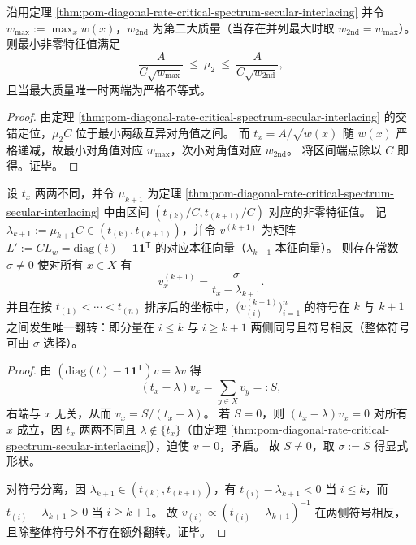 \begin{corollary}[临界谱的交错与首个谱隙夹逼]\label{cor:pom-diagonal-rate-critical-spectrum-gap-bounds}
沿用定理 \ref{thm:pom-diagonal-rate-critical-spectrum-secular-interlacing} 并令 \(w_{\max}:=\max_x w(x)\)，\(w_{\mathrm{2nd}}\) 为第二大质量（当存在并列最大时取 \(w_{\mathrm{2nd}}=w_{\max}\)）。
则最小非零特征值满足
\[
\frac{A}{C\sqrt{w_{\max}}}\ \le\ \mu_2\ \le\ \frac{A}{C\sqrt{w_{\mathrm{2nd}}}},
\]
且当最大质量唯一时两端为严格不等式。
\end{corollary}
\begin{proof}
由定理 \ref{thm:pom-diagonal-rate-critical-spectrum-secular-interlacing} 的交错定位，\(\mu_2 C\) 位于最小两级互异对角值之间。
而 \(t_x=A/\sqrt{w(x)}\) 随 \(w(x)\) 严格递减，故最小对角值对应 \(w_{\max}\)，次小对角值对应 \(w_{\mathrm{2nd}}\)。
将区间端点除以 \(C\) 即得。证毕。
\end{proof}

\begin{proposition}[临界本征向量的显式形状与符号分离]\label{prop:pom-diagonal-rate-critical-eigenvector-shape-sign-separation}
设 \(t_x\) 两两不同，并令 \(\mu_{k+1}\) 为定理 \ref{thm:pom-diagonal-rate-critical-spectrum-secular-interlacing} 中由区间 \((t_{(k)}/C,t_{(k+1)}/C)\) 对应的非零特征值。
记 \(\lambda_{k+1}:=\mu_{k+1}C\in(t_{(k)},t_{(k+1)})\)，并令 \(v^{(k+1)}\) 为矩阵 \(L':=CL_w=\mathrm{diag}(t)-\mathbf 1\mathbf 1^{\mathsf T}\) 的对应本征向量（\(\lambda_{k+1}\)-本征向量）。
则存在常数 \(\sigma\ne 0\) 使对所有 \(x\in X\) 有
\[
v^{(k+1)}_x=\frac{\sigma}{t_x-\lambda_{k+1}}.
\]
并且在按 \(t_{(1)}<\cdots<t_{(n)}\) 排序后的坐标中，\(\bigl(v^{(k+1)}_{(i)}\bigr)_{i=1}^n\) 的符号在 \(k\) 与 \(k+1\) 之间发生唯一翻转：即分量在 \(i\le k\) 与 \(i\ge k+1\) 两侧同号且符号相反（整体符号可由 \(\sigma\) 选择）。
\end{proposition}
\begin{proof}
由 \((\mathrm{diag}(t)-\mathbf 1\mathbf 1^{\mathsf T})v=\lambda v\) 得
\[
(t_x-\lambda)v_x=\sum_{y\in X}v_y=:S,
\]
右端与 \(x\) 无关，从而 \(v_x=S/(t_x-\lambda)\)。
若 \(S=0\)，则 \((t_x-\lambda)v_x=0\) 对所有 \(x\) 成立，因 \(t_x\) 两两不同且 \(\lambda\notin\{t_x\}\)（由定理 \ref{thm:pom-diagonal-rate-critical-spectrum-secular-interlacing}），迫使 \(v=0\)，矛盾。
故 \(S\ne 0\)，取 \(\sigma:=S\) 得显式形状。
\par
对符号分离，因 \(\lambda_{k+1}\in(t_{(k)},t_{(k+1)})\)，有 \(t_{(i)}-\lambda_{k+1}<0\) 当 \(i\le k\)，而 \(t_{(i)}-\lambda_{k+1}>0\) 当 \(i\ge k+1\)。
故 \(v_{(i)}\propto (t_{(i)}-\lambda_{k+1})^{-1}\) 在两侧符号相反，且除整体符号外不存在额外翻转。证毕。
\end{proof}

